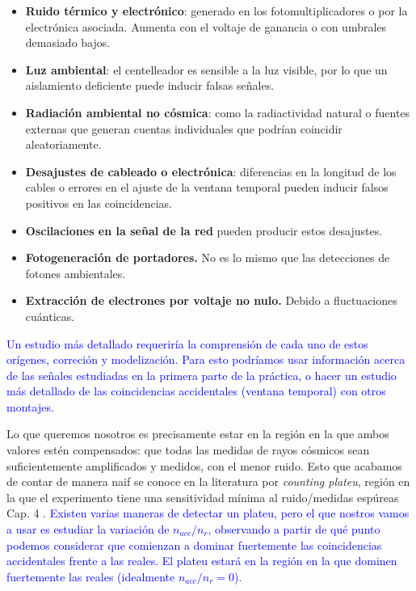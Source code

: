 \documentclass[11pt]{article}
\begin{document}
\begin{itemize}
    \item \textbf{Ruido térmico y electrónico}: generado en los fotomultiplicadores o por la electrónica asociada. Aumenta con el voltaje de ganancia o con umbrales demasiado bajos.

    \item \textbf{Luz ambiental}: el centelleador es sensible a la luz visible, por lo que un aislamiento deficiente puede inducir falsas señales.

    \item \textbf{Radiación ambiental no cósmica}: como la radiactividad natural o fuentes externas que generan cuentas individuales que podrían coincidir aleatoriamente.

    \item \textbf{Desajustes de cableado o electrónica}: diferencias en la longitud de los cables o errores en el ajuste de la ventana temporal pueden inducir falsos positivos en las coincidencias.
	\item \textbf{Oscilaciones en la señal de la red} pueden producir estos desajustes.
    \item \textbf{Fotogeneración de portadores.} No es lo mismo que las detecciones de fotones ambientales. 
    \item \textbf{Extracción de electrones por voltaje no nulo.} Debido a fluctuaciones cuánticas. 
\end{itemize}
\textcolor{blue}{Un estudio más detallado requeriría la comprensión de cada uno de estos orígenes, correción y modelización. Para esto podríamos usar información acerca de las señales estudiadas en la primera parte de la práctica, o hacer un estudio más detallado de las coincidencias accidentales (ventana temporal) con otros montajes. }


Lo que queremos nosotros es precisamente estar en la región en la que ambos valores estén compensados: que todas las medidas de rayos cósmicos sean suficientemente amplificados y medidos, con el menor ruido. Esto que acabamos de contar de manera naif se conoce en la literatura por \textit{counting plateu}, región en la que el experimento tiene una sensitividad mínima al ruido/medidas espúreas Cap. 4 \cite{Knoll:1300754}. \textcolor{blue}{Existen varias maneras de detectar un plateu, pero el que nostros vamos a usar es estudiar la variación de $n_{acc}/n_r$, observando a partir de qué punto podemos considerar que comienzan a dominar fuertemente las coincidencias accidentales frente a las reales. El plateu estará en la región en la que dominen fuertemente las reales (idealmente $n_{acc}/n_r=0$).}
\end{document}
